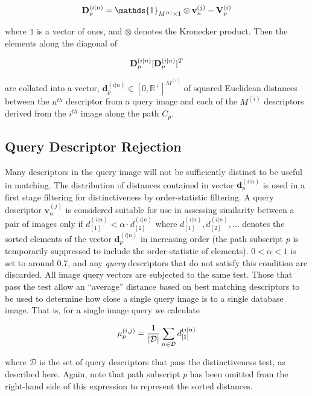 \begin{equation}
\centering
\mathbf{D}^{(i|n)}_p =  \mathds{1}_{M^{(i)}\times 1} \otimes \mathbf{v}_n^{(j)} - \mathbf{V}^{(i)}_p
\end{equation}

where $\mathds{1}$ is a vector of ones, and $\otimes$ denotes the Kronecker product.
Then the elements along the diagonal of

\begin{equation}
\centering
 \mathbf{D}^{(i|n)}_p[\mathbf{D}^{(i|n)}_p]^T
\end{equation}

are collated into a vector, $\mathbf{d}^{(i|n)}_p \in [0,\mathbb{R}^+]^{M^{(i)}}$ of squared Euclidean distances between the $n^{th}$ descriptor from a query image and each of the $M^{(i)}$ descriptors derived from the $i^{th}$ image along the path $C_p$. 

\subsection{Query Descriptor Rejection} \label{subsec:querydescrejection}
Many descriptors in the query image will not be sufficiently distinct to be useful in matching.  The distribution of distances contained in vector $\mathbf{d}^{(i|n)}_p$ is used in a first stage filtering for distinctiveness by order-statistic filtering.  A query descriptor $\mathbf{v}_n^{(j)}$ is considered suitable for use in assessing similarity between a pair of images only if $d^{(i|n)}_{[1]} < \alpha \cdot d^{(i|n)}_{[2]}$ where $d^{(i|n)}_{[1]}, d^{(i|n)}_{[2]},\ldots $ denotes the sorted elements of the vector $\mathbf{d}^{(i|n)}_p$ in increasing order (the path subscript $p$ is temporarily suppressed to include the order-statistic of elements).  $0<\alpha<1$ is set to around 0.7, and any {\it query} descriptors that do not satisfy this condition are discarded. All image query vectors are subjected to the same test.  Those that pass the test allow an ``average'' distance based on best matching descriptors to be used to determine how close a single query image is to a single database image.  That is, for a single image query  we  calculate

\begin{equation}
\centering
\mu^{(i,j)}_p=\frac{1}{|\mathcal{D}|}\sum_{n\in \mathcal{D}} d^{(i|n)}_{[1]}
\end{equation}

where $\mathcal{D}$ is the set of query descriptors that pass the distinctiveness test, as described here. Again, note that path subscript $p$ has been omitted from the right-hand side of this expression to represent the sorted distances.

